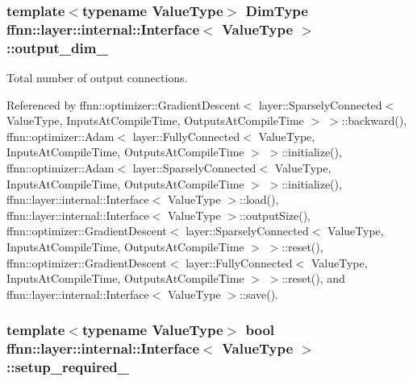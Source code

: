 \hypertarget{classffnn_1_1layer_1_1internal_1_1_interface_a2540e4455843a2100efe4c7de9a62df0}{
\subsubsection[{output\-\_\-dim\-\_\-}]{\setlength{\rightskip}{0pt plus 5cm}template$<$typename Value\-Type$>$ {\bf Dim\-Type} {\bf ffnn\-::layer\-::internal\-::\-Interface}$<$ Value\-Type $>$\-::output\-\_\-dim\-\_\-\hspace{0.3cm}{\ttfamily [protected]}}}\label{classffnn_1_1layer_1_1internal_1_1_interface_a2540e4455843a2100efe4c7de9a62df0}


Total number of output connections. 



Referenced by ffnn\-::optimizer\-::\-Gradient\-Descent$<$ layer\-::\-Sparsely\-Connected$<$ Value\-Type, Inputs\-At\-Compile\-Time, Outputs\-At\-Compile\-Time $>$ $>$\-::backward(), ffnn\-::optimizer\-::\-Adam$<$ layer\-::\-Fully\-Connected$<$ Value\-Type, Inputs\-At\-Compile\-Time, Outputs\-At\-Compile\-Time $>$ $>$\-::initialize(), ffnn\-::optimizer\-::\-Adam$<$ layer\-::\-Sparsely\-Connected$<$ Value\-Type, Inputs\-At\-Compile\-Time, Outputs\-At\-Compile\-Time $>$ $>$\-::initialize(), ffnn\-::layer\-::internal\-::\-Interface$<$ Value\-Type $>$\-::load(), ffnn\-::layer\-::internal\-::\-Interface$<$ Value\-Type $>$\-::output\-Size(), ffnn\-::optimizer\-::\-Gradient\-Descent$<$ layer\-::\-Sparsely\-Connected$<$ Value\-Type, Inputs\-At\-Compile\-Time, Outputs\-At\-Compile\-Time $>$ $>$\-::reset(), ffnn\-::optimizer\-::\-Gradient\-Descent$<$ layer\-::\-Fully\-Connected$<$ Value\-Type, Inputs\-At\-Compile\-Time, Outputs\-At\-Compile\-Time $>$ $>$\-::reset(), and ffnn\-::layer\-::internal\-::\-Interface$<$ Value\-Type $>$\-::save().

\hypertarget{classffnn_1_1layer_1_1internal_1_1_interface_a57f0de55599c9b6621a66096b5662ca8}{
\subsubsection[{setup\-\_\-required\-\_\-}]{\setlength{\rightskip}{0pt plus 5cm}template$<$typename Value\-Type$>$ bool {\bf ffnn\-::layer\-::internal\-::\-Interface}$<$ Value\-Type $>$\-::setup\-\_\-required\-\_\-\hspace{0.3cm}{\ttfamily [protected]}}}\label{classffnn_1_1layer_1_1internal_1_1_interface_a57f0de55599c9b6621a66096b5662ca8}


